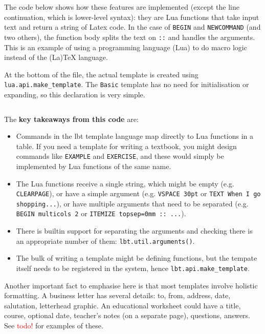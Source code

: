\documentclass[11pt]{article}
\newcommand{\lbtlabel}{\textsf{lbt}}
\begin{document}
The code below shows how these features are implemented (except the line continuation, which is lower-level syntax): they are Lua functions that take input text and return a string of Latex code. In the case of \texttt{BEGIN} and \texttt{NEWCOMMAND} (and two others), the function body splits the text on \texttt{::} and handles the arguments. This is an example of using a programming language (Lua) to do macro logic instead of the (La)TeX language.

At the bottom of the file, the actual template is created using \texttt{lua.api.make\_template}. The \texttt{Basic} template has no need for initialisation or expanding, so this declaration is very simple.

\inputminted{lua}{media/impl-lbt-5-builtin-templates.lua}

The \textbf{key takeaways from this code} are:
\begin{itemize}
  \item Commands in the \lbtlabel{} template language map directly to Lua functions in a table. If you need a template for writing a textbook, you might design commands like \texttt{EXAMPLE} and \texttt{EXERCISE}, and these would simply be implemented by Lua functions of the same name.
  \item The Lua functions receive a single string, which might be empty (e.g. \texttt{CLEARPAGE}), or have a simple argument (e.g. \texttt{VSPACE 30pt} or \texttt{TEXT When I go shopping...}), or have multiple arguments that need to be separated (e.g. \texttt{BEGIN multicols 2} or \texttt{ITEMIZE topsep=0mm :: ...}).
  \item There is builtin support for separating the arguments and checking there is an appropriate number of them: \texttt{lbt.util.arguments()}.
  \item The bulk of writing a template might be defining functions, but the tempate itself needs to be registered in the system, hence \texttt{lbt.api.make\_template}.
\end{itemize}

Another important fact to emphasise here is that most templates involve holistic formatting. A business letter has several details: to, from, address, date, salutation, letterhead graphic. An educational worksheet could have a title, course, optional date, teacher's notes (on a separate page), questions, answers. See \textcolor{red}{todo!} for examples of these.

\end{document}

